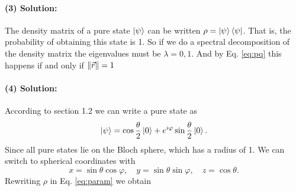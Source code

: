 \paragraph{(3) Solution:} The density matrix of a pure state $\ket{\psi}$ can be written $\rho = \ket{\psi} \bra{\psi}$. That is, the probability of obtaining this state is 1. So if we do a spectral decomposition of the density matrix the eigenvalues must be $\lambda = 0,1$. And by Eq. \eqref{eq:pq} this happens if and only if $\norm{\vec{r}} = 1$

\paragraph{(4) Solution:} According to section 1.2 we can write a pure state as 
\begin{equation}
    \ket{\psi} = \cos\frac{\theta}{2}\ket{0} + e^{i\varphi}\sin\frac{\theta}{2}\ket{0}.
\end{equation}
Since all pure states lie on the Bloch sphere, which has a radius of 1. We can switch to spherical coordinates with
\begin{equation}
    x = \sin\theta \cos\varphi, \quad y = \sin\theta \sin\varphi, \quad z = \cos\theta.
\end{equation}
Rewriting $\rho$ in Eq. \eqref{eq:param} we obtain
